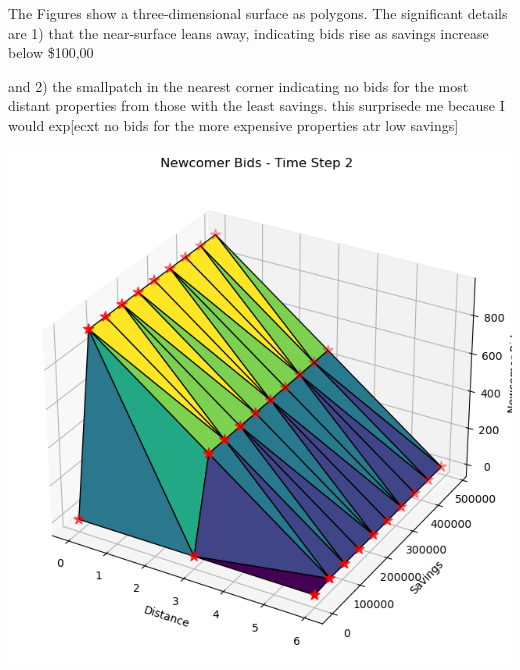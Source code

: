 \documentclass{article}
\begin{document}
The Figures show a  three-dimensional surface as polygons. The significant details are  1) that the near-surface leans away, indicating bids rise as savings increase below \$100,00

and 2) the smallpatch in the nearest corner indicating no bids for the most distant properties from those with the least savings. this surprisede me because I would exp[ecxt no bids for the more expensive properties atr low savings]
 

\includegraphics[scale=.9]{fig/Analysis/Savings-distanc-bids.png}








 
\end{document}
